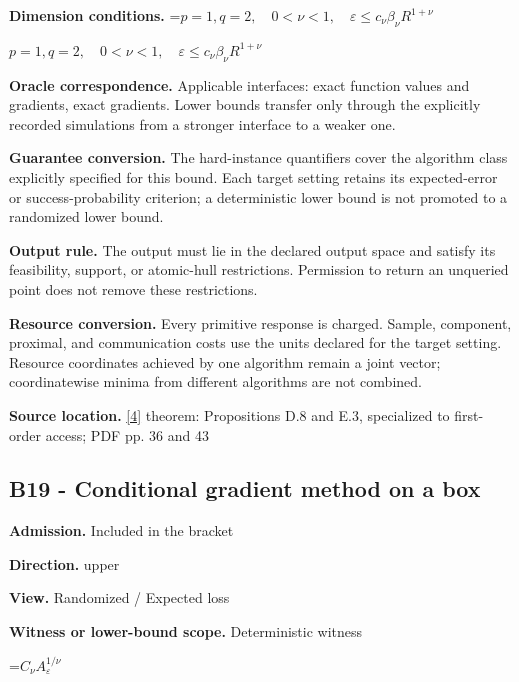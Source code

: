 \documentclass[10pt,a4paper]{article}
\newcommand{\AtlasMath}[1]{\par\begingroup\centering\setbox0=\hbox{$\displaystyle #1$}\ifdim\wd0>1.4\linewidth\typeout{ATLAS WIDE FORMULA: \the\wd0}\fi\ifdim\wd0>\linewidth\resizebox{\linewidth}{!}{\box0}\else\box0\fi\par\endgroup}
\newcommand{\AtlasInlineMath}[1]{\begingroup\setbox0=\hbox{$#1$}\ifdim\wd0>.4\linewidth\endgroup\AtlasMath{#1}\else\endgroup$#1$\fi}
\begin{document}
\textbf{Dimension conditions.} \AtlasInlineMath{p=1,q=2,\quad0<\nu<1,\quad\varepsilon\le c_\nu\beta_\nu R^{1+\nu}}



\textbf{Oracle correspondence.} Applicable interfaces: exact function values and gradients, exact gradients. Lower bounds transfer only through the explicitly recorded simulations from a stronger interface to a weaker one.



\textbf{Guarantee conversion.} The hard-instance quantifiers cover the algorithm class explicitly specified for this bound. Each target setting retains its expected-error or success-probability criterion; a deterministic lower bound is not promoted to a randomized lower bound.



\textbf{Output rule.} The output must lie in the declared output space and satisfy its feasibility, support, or atomic-hull restrictions. Permission to return an unqueried point does not remove these restrictions.



\textbf{Resource conversion.} Every primitive response is charged. Sample, component, proximal, and communication costs use the units declared for the target setting. Resource coordinates achieved by one algorithm remain a joint vector; coordinatewise minima from different algorithms are not combined.



\textbf{Source location.} \href{https://arxiv.org/pdf/2609.32910}{[4]} theorem: Propositions D.8 and E.3, specialized to first-order access; PDF pp. 36 and 43



\subsection{B19 - Conditional gradient method on a box}


\textbf{Admission.} Included in the bracket



\textbf{Direction.} upper



\textbf{View.} Randomized / Expected loss



\textbf{Witness or lower-bound scope.} Deterministic witness



\AtlasMath{C_\nu A_\varepsilon^{1/\nu}}
\end{document}
